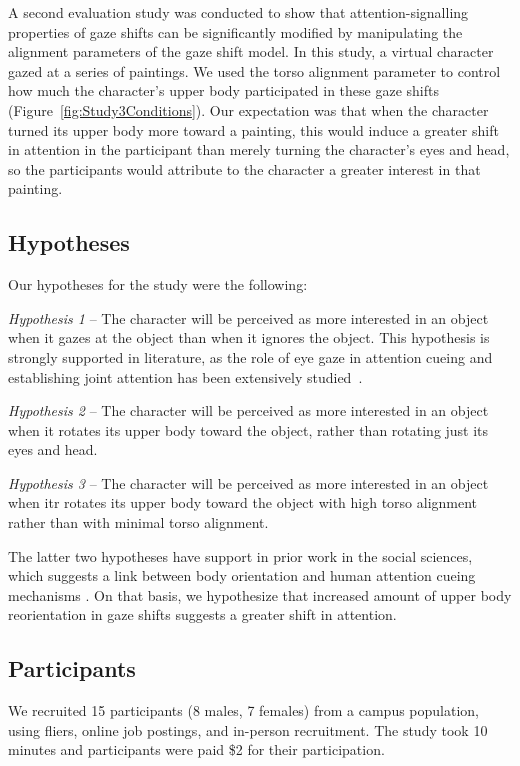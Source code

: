 A second evaluation study was conducted to show that attention-signalling properties of gaze shifts can be significantly modified by manipulating the alignment parameters of the gaze shift model. In this study, a virtual character gazed at a series of paintings. We used the torso alignment parameter to control how much the character's upper body participated in these gaze shifts (Figure~\ref{fig:Study3Conditions}). Our expectation was that when the character turned its upper body more toward a painting, this would induce a greater shift in attention in the participant than merely turning the character's eyes and head, so the participants would attribute to the character a greater interest in that painting.

\subsection{Hypotheses}

Our hypotheses for the study were the following:

\emph{Hypothesis 1} -- The character will be perceived as more interested in an object when it gazes at the object than when it ignores the object. This hypothesis is strongly supported in literature, as the role of eye gaze in attention cueing and establishing joint attention has been extensively studied~\cite{frischen2007gaze}.

\emph{Hypothesis 2} -- The character will be perceived as more interested in an object when it rotates its upper body toward the object, rather than rotating just its eyes and head.

\emph{Hypothesis 3} -- The character will be perceived as more interested in an object when itr rotates its upper body toward the object with high torso alignment rather than with minimal torso alignment.

The latter two hypotheses have support in prior work in the social sciences, which suggests a link between body orientation and human attention cueing mechanisms \cite{hietanen2002social,pomianowska2011socialcues,kendon1990conducting,schegloff1998bodytorque}. On that basis, we hypothesize that increased amount of upper body reorientation in gaze shifts suggests a greater shift in attention.

\subsection{Participants}

We recruited 15 participants (8 males, 7 females) from a campus population, using fliers, online job postings, and in-person recruitment. The study took 10 minutes and participants were paid \$2 for their participation.


